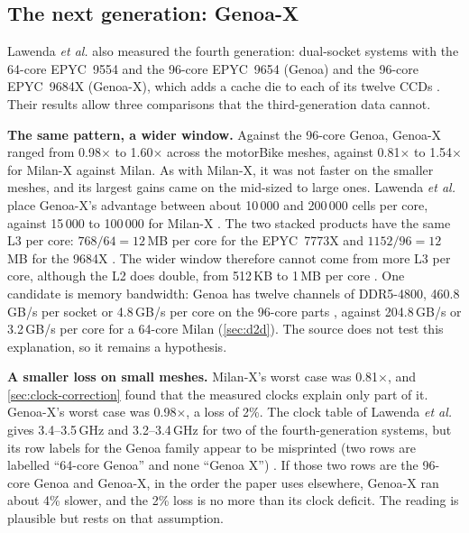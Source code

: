 \subsection{The next generation: Genoa-X}
\label{sec:genoax}
Lawenda \emph{et al.} also measured the fourth generation: dual-socket systems with the 64-core EPYC~9554 and the 96-core EPYC~9654 (Genoa) and the 96-core EPYC~9684X (Genoa-X), which adds a cache die to each of its twelve CCDs \cite{lawendaEvaluatingImpactL32025}. Their results allow three comparisons that the third-generation data cannot.

\textbf{The same pattern, a wider window.} Against the 96-core Genoa, Genoa-X ranged from 0.98$\times$ to 1.60$\times$ across the motorBike meshes, against 0.81$\times$ to 1.54$\times$ for Milan-X against Milan. As with Milan-X, it was not faster on the smaller meshes, and its largest gains came on the mid-sized to large ones. Lawenda \emph{et al.} place Genoa-X's advantage between about 10\,000 and 200\,000 cells per core, against 15\,000 to 100\,000 for Milan-X \cite{lawendaEvaluatingImpactL32025}. The two stacked products have the same L3 per core: $768/64 = 12$\,MB per core for the EPYC~7773X \cite{lawendaEvaluatingImpactL32025} and $1152/96 = 12$\,MB for the 9684X \cite{advancedmicrodevicesinc.AMDEPYC90042023}. The wider window therefore cannot come from more L3 per core, although the L2 does double, from 512\,KB to 1\,MB per core \cite{lawendaEvaluatingImpactL32025}. One candidate is memory bandwidth: Genoa has twelve channels of DDR5-4800, 460.8\,GB/s per socket or 4.8\,GB/s per core on the 96-core parts \cite{advancedmicrodevicesinc.AMDEPYC90042023}, against 204.8\,GB/s or 3.2\,GB/s per core for a 64-core Milan (\cref{sec:d2d}). The source does not test this explanation, so it remains a hypothesis.

\textbf{A smaller loss on small meshes.} Milan-X's worst case was 0.81$\times$, and \cref{sec:clock-correction} found that the measured clocks explain only part of it. Genoa-X's worst case was 0.98$\times$, a loss of 2\%. The clock table of Lawenda \emph{et al.} gives 3.4--3.5\,GHz and 3.2--3.4\,GHz for two of the fourth-generation systems, but its row labels for the Genoa family appear to be misprinted (two rows are labelled ``64-core Genoa'' and none ``Genoa X'') \cite[Table~5]{lawendaEvaluatingImpactL32025}. If those two rows are the 96-core Genoa and Genoa-X, in the order the paper uses elsewhere, Genoa-X ran about 4\% slower, and the 2\% loss is no more than its clock deficit. The reading is plausible but rests on that assumption.

